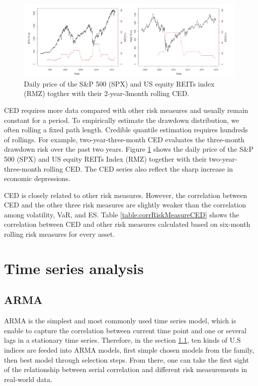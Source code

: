 \documentclass[11pt]{article}
\begin{document}
\begin{figure}
\centering 
\includegraphics[width = 1\textwidth]{../figures/SPX_RMZ_P_CED}
\caption{Daily price of the S\&P 500 (SPX) and US equity REITs index (RMZ) togther with their 2-year-3month rolling CED.} 
\label{fig:SPX_RMZ_P_CED}
\end{figure}

CED requires more data compared with other risk measures and usually remain constant for a period. To empirically estimate the drawdown distribution, we often rolling a fixed path length. Credible quantile estimation requires hundreds of rollings. For example, two-year-three-month CED evaluates the three-month drawdown risk over the past two years. Figure \ref{fig:SPX_RMZ_P_CED} shows the daily price of the S\&P 500 (SPX) and US equity REITs Index (RMZ) together with their two-year-three-month rolling CED. The CED series also reflect the sharp increase in economic depressions.

CED is closely related to other risk measures. However, the correlation between CED and the other three risk measures are slightly weaker than the correlation among volatility, VaR, and ES. Table \ref{table:corrRiskMeasureCED} shows the correlation between CED and other risk measures calculated based on six-month rolling risk measures for every asset. 

\section{Time series analysis}
\subsection{ARMA} \label{arma}
ARMA is the simplest and most commonly used time series model, which is enable to capture the correlation between current time point and one or several lags in a stationary time series. Therefore, in the section \ref{arma}, ten kinds of U.S indices are feeded into ARMA models, first simple chosen models from the family, then best model through selection steps. From there, one can take the first sight of the relationship between serial correlation and different risk measurements in real-world data.
\end{document}
